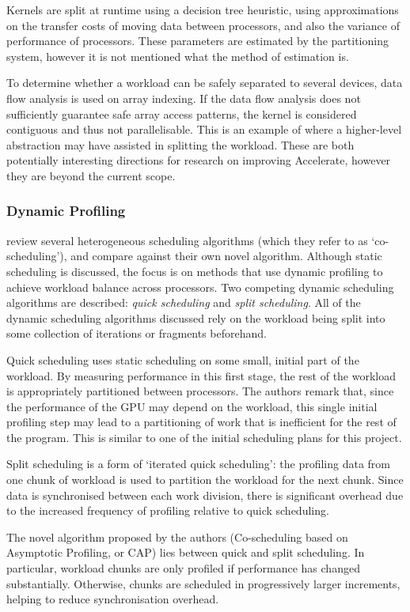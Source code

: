\documentclass[a4paper,12pt]{article}
\begin{document}
Kernels are split at runtime using a decision tree heuristic, using approximations on the transfer costs of moving data between processors, and also the variance of performance of processors.
These parameters are estimated by the partitioning system, however it is not mentioned what the method of estimation is.

To determine whether a workload can be safely separated to several devices, data flow analysis is used on array indexing.
If the data flow analysis does not sufficiently guarantee safe array access patterns, the kernel is considered contiguous and thus not parallelisable.
This is an example of where a higher-level abstraction may have assisted in splitting the workload.
These are both potentially interesting directions for research on improving Accelerate, however they are beyond the current scope.

\subsubsection*{Dynamic Profiling}
\citet*{wang_cpu+gpu_2014} review several heterogeneous scheduling algorithms (which they refer to as `co-scheduling'), and compare against their own novel algorithm.
Although static scheduling is discussed, the focus is on methods that use dynamic profiling to achieve workload balance across processors.
Two competing dynamic scheduling algorithms are described: \textit{quick scheduling} and \textit{split scheduling}.
All of the dynamic scheduling algorithms discussed rely on the workload being split into some collection of iterations or fragments beforehand.

Quick scheduling uses static scheduling on some small, initial part of the workload.
By measuring performance in this first stage, the rest of the workload is appropriately partitioned between processors.
The authors remark that, since the performance of the GPU may depend on the workload, this single initial profiling step may lead to a partitioning of work that is inefficient for the rest of the program.
This is similar to one of the initial scheduling plans for this project.

Split scheduling is a form of `iterated quick scheduling': the profiling data from one chunk of workload is used to partition the workload for the next chunk.
Since data is synchronised between each work division, there is significant overhead due to the increased frequency of profiling relative to quick scheduling.

The novel algorithm proposed by the authors (Co-scheduling based on Asymptotic Profiling, or CAP) lies between quick and split scheduling.
In particular, workload chunks are only profiled if performance has changed substantially.
Otherwise, chunks are scheduled in progressively larger increments, helping to reduce synchronisation overhead.
\end{document}
